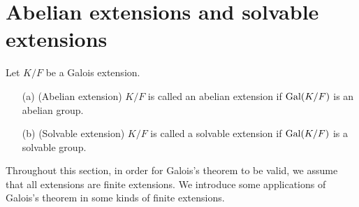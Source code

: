 \section{Abelian extensions and solvable extensions}

\begin{defi}
    Let $K/F$ be a Galois extension.
    \begin{enumerate}
        \item[(a)]
        {
            (Abelian extension)
            $K/F$ is called an abelian extension if ${\textrm{Gal}({K/F})}$ is an abelian group.
        }
        \item[(b)]
        {
            (Solvable extension)
            $K/F$ is called a solvable extension if ${\textrm{Gal}({K/F})}$ is a solvable group.
        }
    \end{enumerate}
\end{defi}

Throughout this section, in order for Galois's theorem to be valid, we assume that all extensions are finite extensions.
We introduce some applications of Galois's theorem in some kinds of finite extensions.

